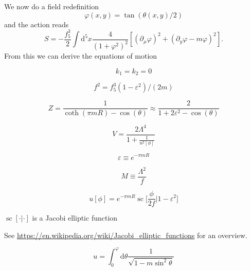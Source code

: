 \documentclass[master,       %
               twoside,        %
               BCOR10mm,       %
               english,ngerman, %
               ]{GAUBM}
\begin{document}
\begin{otherlanguage}{english}
 



We now do a field redefinition 
\begin{equation}
	\varphi(x, y) = \tan(\theta(x, y) / 2)
\end{equation}
and the action reads
\begin{equation}
	S = - \frac{f_5^3}{2} \int \mathrm{d}^5 x \frac{4}{(1 + \varphi^2)^2} \left[ (\partial_\mu \varphi)^2 + (\partial_y \varphi - m \varphi)^2 \right].
\end{equation}
From this we can derive the equations of motion 


\begin{equation}
	k_1 = k_2 = 0
\end{equation}







\begin{equation}
	f^2 = f_5^3 (1 - \varepsilon^2) / (2m)
\end{equation}

\begin{equation}
	Z = \frac{1}{\coth(\pi m R) - \cos(\theta)} \approx \frac{2}{1 + 2\varepsilon^2 - \cos(\theta)}
\end{equation}

\begin{equation}
	V = \frac{2 \Lambda^4}{1 + \frac{1}{u^2[\phi]}}
\end{equation}

\begin{equation}
	\varepsilon \equiv e^{- \pi m R}
\end{equation}

\begin{equation}
	M \equiv \frac{\Lambda^2}{f}
\end{equation}

\begin{equation}
	u[\phi] = e^{-\pi mR} \operatorname{sc} \big[ \frac{\phi}{2f} \big| 1 - \varepsilon^2 \big]
\end{equation}

$\operatorname{sc}[\cdot | \cdot]$ is a Jacobi elliptic function

See \url{https://en.wikipedia.org/wiki/Jacobi_elliptic_functions} for an overview.

\begin{equation}
	u = \int_0^\varphi \mathrm{d} \theta \frac{1}{\sqrt{1 - m \sin^2 \theta}}
\end{equation}


\end{otherlanguage}
\end{document}
